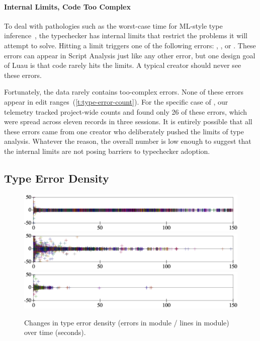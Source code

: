 \documentclass[english,submission,cleveref]{programming}
\begin{document}
\paragraph{Internal Limits, Code Too Complex}
\label{s:code-too-complex}

To deal with pathologies such as the worst-case time for ML-style type
inference~\cite{m-popl-1990,ktu-caap-1990}, the typechecker
has internal limits that restrict the problems it will attempt to solve.
Hitting a limit triggers one of the following errors:
,
, or
.
These errors can appear in Script Analysis just like any other
error, but one design goal of Luau is that code rarely hits the limits.
A typical creator should never see these errors.

Fortunately, the data rarely contains too-complex errors.
None of these errors appear in edit ranges~(\cref{t:type-error-count}).
For the specific case of , our telemetry tracked project-wide
counts and found only 26 of these errors, which were spread across eleven
records in three sessions.
It is entirely possible that all these errors came from one creator who
deliberately pushed the limits of type analysis.
Whatever the reason, the overall number is low enough to suggest that the
internal limits are not posing barriers to typechecker adoption.


\subsection{Type Error Density}

\begin{figure}[t]\centering

  \mnocheck{}
  \includegraphics[width=\columnwidth]{img/error-count-nocheck-row--te-density-diff.pdf}
  \medskip
  \mnonstrict{}
  \includegraphics[width=\columnwidth]{img/error-count-nonstrict-row--te-density-diff.pdf}
  \medskip
  \mstrict{}
  \includegraphics[width=\columnwidth]{img/error-count-strict-row--te-density-diff.pdf}
  \caption{Changes in type error density (errors in module / lines in module) over time (seconds).}
  \label{f:error-density}
\end{figure}
\end{document}
